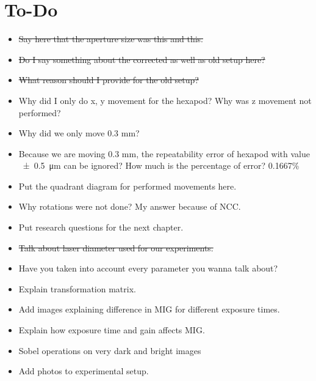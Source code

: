 \section*{To-Do}
\begin{itemize}
    \item \sout{Say here that the aperture size was this and this.}
    \item \sout{Do I say something about the corrected as well as old setup here?}
    \item \sout{What reason should I provide for the old setup?}
    \item Why did I only do x, y movement for the hexapod? Why was z movement not performed?
    \item Why did we only move 0.3 mm?
    \item Because we are moving 0.3 mm, the repeatability error of hexapod with value \SI{\pm0.5}{\micro\meter} can be ignored? How much is the percentage of error? 0.1667\%
    \item Put the quadrant diagram for performed movements here.
    \item Why rotations were not done? My answer because of NCC.
    \item Put research questions for the next chapter.
    \item \sout{Talk about laser diameter used for our experiments.}
    \item Have you taken into account every parameter you wanna talk about?
    \item Explain transformation matrix. 
    \item Add images explaining difference in MIG for different exposure times.
    \item Explain how exposure time and gain affects MIG.
    \item Sobel operations on very dark and bright images
    \item Add photos to experimental setup.
\end{itemize}
